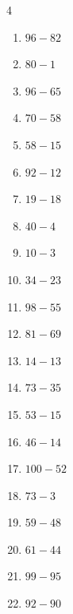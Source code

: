 \begin{multicols}{4}
\begin{enumerate}
  \item $96-82$
        \phantom{$=14$}

  \item $80-1$
        \phantom{$=79$}

  \item $96-65$
        \phantom{$=31$}

  \item $70-58$
        \phantom{$=12$}

  \item $58-15$
        \phantom{$=43$}

  \item $92-12$
        \phantom{$=80$}

  \item $19-18$
        \phantom{$=1$}

  \item $40-4$
        \phantom{$=36$}

  \item $10-3$
        \phantom{$=7$}

  \item $34-23$
        \phantom{$=11$}

  \item $98-55$
        \phantom{$=43$}

\columnbreak %

  \item $81-69$
        \phantom{$=12$}

  \item $14-13$
        \phantom{$=1$}

  \item $73-35$
        \phantom{$=38$}

  \item $53-15$
        \phantom{$=38$}

  \item $46-14$
        \phantom{$=32$}

  \item $100-52$
        \phantom{$=48$}

  \item $73-3$
        \phantom{$=70$}

  \item $59-48$
        \phantom{$=11$}

  \item $61-44$
        \phantom{$=17$}

  \item $99-95$
        \phantom{$=4$}

  \item $92-90$
        \phantom{$=2$}


\end{enumerate}
\end{multicols}
